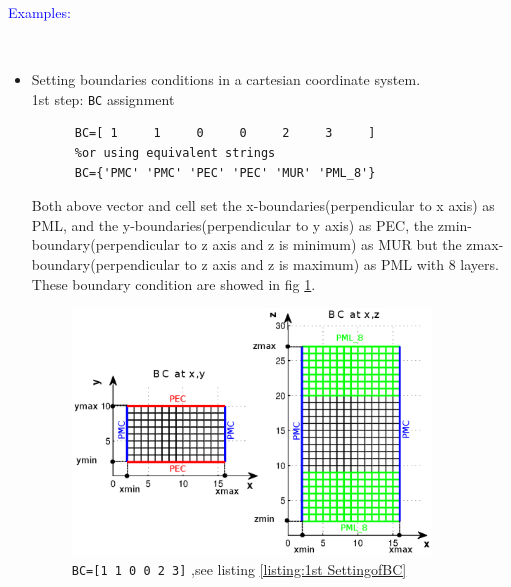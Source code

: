 	\textcolor{blue}{\begin{large}Examples:\end{large}}\\
\begin{itemize}
 \item    Setting boundaries conditions in a cartesian coordinate system.\\
       1st step: \texttt{BC} assignment
    \begin{myindentpar}
	  \begin{lstlisting}[caption={BC assignment as fig \ref{fig:Ex. 1st of SetBoundaryCond} },label={listing:1st SettingofBC}]
	  %using numbers 
	  BC=[ 1     1     0     0     2     3     ] 
	  %or using equivalent strings
	  BC={'PMC' 'PMC' 'PEC' 'PEC' 'MUR' 'PML_8'} 
		      \end{lstlisting}
	  Both above vector and cell set  the x-boundaries(perpendicular to x axis) as PML, and the y-boundaries(perpendicular to y axis) as PEC, the zmin-boundary(perpendicular to z axis and z is minimum) as MUR but the zmax-boundary(perpendicular to z axis and z is maximum) as PML with 8 layers. These boundary condition are showed in fig \ref{fig:Ex. 1st of SetBoundaryCond}.
	      \begin{figure}[ht]
		      \centering
\includegraphics[width=0.9\textwidth]{svg/BCXY.eps}
		      \caption[1st example for the setting of boundaries conditions]{\texttt{BC=[1 1  0 0  2 3]} ,see listing \ref{listing:1st SettingofBC}}
		      \label{fig:Ex. 1st of SetBoundaryCond}
		\end{figure}
    \end{myindentpar}

\end{itemize}
